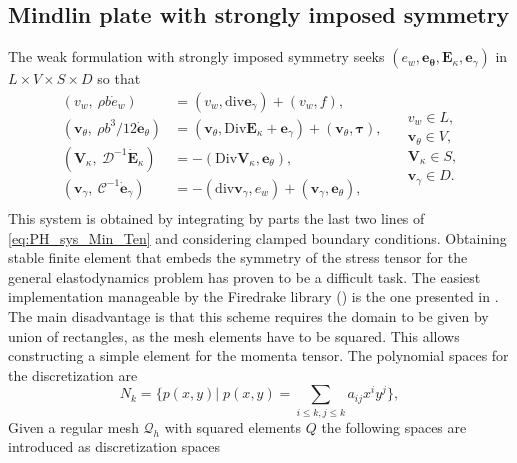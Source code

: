 \documentclass{ifacconf}
\begin{document}
\subsection{Mindlin plate with strongly imposed symmetry}

The weak formulation with strongly imposed symmetry seeks $(e_w, \bm{e}_{\bm{\theta}}, \bm{E}_{\kappa}, \bm{e}_{\gamma})$ in $L \times V \times S \times D$ so that 
\begin{equation}
\label{eq:weak_min_PH_strong}
\begin{aligned}
(v_w, \ \rho b \dot{e}_w) &= (v_w, \mathrm{div} \bm{e}_\gamma) + (v_w, f), \\ 
(\bm{v}_\theta, \ \rho b^3/12  \dot{\bm{e}}_\theta) &= (\bm{v}_\theta, \mathrm{Div} \bm{E}_\kappa + \bm{e}_\gamma) + (\bm{v}_\theta, \bm{\tau}), \\  
(\bm{V}_\kappa, \ \mathcal{D}^{-1} \dot{\bm{E}}_\kappa) &= -(\mathrm{Div} \bm{V}_\kappa,  \bm{e}_\theta), \\ 
(\bm{v}_\gamma, \ \mathcal{C}^{-1} \dot{\bm{e}}_\gamma) &= -(\mathrm{div} \bm{v}_\gamma, e_w ) + (\bm{v}_\gamma, \bm{e}_{\theta}), \\ 
\end{aligned} \quad
\begin{aligned}
v_w \in L, \\
\bm{v}_\theta \in V, \\
\bm{V}_\kappa \in S, \\
\bm{v}_\gamma \in D.
\end{aligned}
\end{equation}
This system is obtained by integrating by parts the last two lines of \eqref{eq:PH_sys_Min_Ten} and considering clamped boundary conditions. Obtaining stable finite element that embeds the symmetry of the stress tensor for the general elastodynamics problem has proven to be a difficult task. The easiest implementation manageable by the Firedrake library (\cite{rathgeber2017firedrake}) is the one presented in \cite{becacheWave,becacheElas}. The main disadvantage is that this scheme requires the domain to be given by union of rectangles, as the mesh elements have to be squared. This allows constructing a simple element for the momenta tensor. The polynomial spaces for the discretization are
\[
N_{k} = \{p(x, y)| \; p(x, y) = \sum_{i\le k, j\le k} a_{ij} x^i y^j  \},
\]
Given a regular mesh $\mathcal{Q}_h$ with squared elements $Q$ the following spaces are introduced as discretization spaces
\end{document}
